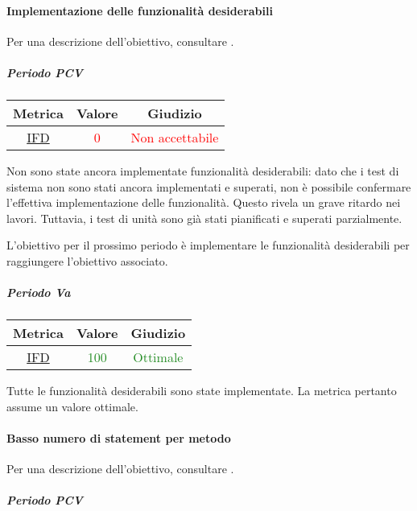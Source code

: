 			\newpage
			\paragraph{Implementazione delle funzionalità desiderabili}
			Per una descrizione dell'obiettivo, consultare .
				\subparagraph{Periodo PCV}
				
				\begin{table}[H]
					\centering
					\begin{tabular}{  c | c | c}
						\hline
						\textbf{Metrica} & \textbf{Valore} & \textbf{Giudizio} \\
						\hline
						\hyperref[MMC]{IFD}   & \textcolor{Red}{0}          & \textcolor{Red}{Non accettabile}  \\ \hline
					\end{tabular} 
				\end{table}
			
			Non sono state ancora implementate funzionalità desiderabili: dato che i test di sistema non sono stati ancora implementati e superati, non è possibile confermare l'effettiva implementazione delle funzionalità. Questo rivela un grave ritardo nei lavori. Tuttavia, i test di unità sono già stati pianificati e superati parzialmente. 
			
			
			L'obiettivo per il prossimo periodo è implementare le funzionalità desiderabili per raggiungere l'obiettivo associato.
				
				\subparagraph{Periodo Va}
				
				\begin{table}[H]
					\centering
					\begin{tabular}{  c | c | c}
						\hline
						\textbf{Metrica} & \textbf{Valore} & \textbf{Giudizio} \\
						\hline
						\hyperref[MMC]{IFD}   & \textcolor{ForestGreen}{100}          & \textcolor{ForestGreen}{Ottimale}  \\ \hline
					\end{tabular} 
				\end{table}
				
				Tutte le funzionalità desiderabili sono state implementate. La metrica pertanto assume un valore ottimale.
				
				
			\newpage
			
			\paragraph{Basso numero di statement per metodo}
			Per una descrizione dell'obiettivo, consultare .
				\subparagraph{Periodo PCV}
			
